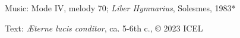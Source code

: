 





\begin{hymnsource}
Music: Mode IV, melody 70; \emph{Liber Hymnarius}, Solesmes, 1983*

Text: \emph{Æterne lucis conditor}, ca. 5-6th c., © 2023 ICEL
\end{hymnsource}
